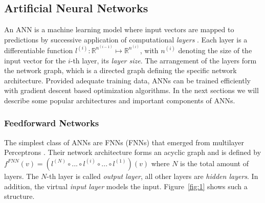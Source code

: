 
\subsection{Artificial Neural Networks}
An \ac{ANN} is a machine learning model where input vectors are mapped to predictions by successive application of computational \textit{layers} \autocite{rumelhart_parallel_1986}. Each layer is a differentiable function $l^{(i)}: \mathbb{R}^{n^{(i-1)}} \mapsto \mathbb{R}^{n^{(i)}}$, with $n^{(i)}$ denoting the size of the input vector for the $i$-th layer, its \textit{layer size}. The arrangement of the layers form the network graph, which is a directed graph defining the specific network architecture. Provided adequate training data, \ac{ANN}s can be trained efficiently with gradient descent based optimization algorithms. In the next sections we will describe some popular architectures and important components of \ac{ANN}s. 

\subsubsection{Feedforward Networks}
The simplest class of \ac{ANN}s are \acl{FNN}s (\acs{FNN}s) that emerged from multilayer Perceptrons \autocite{rosenblatt_perceptron_1958}. Their network architecture forms an acyclic graph and is defined by $f^{FNN}(v) = (l^{(N)} \circ ... \circ l^{(i)} \circ ... \circ l^{(1)})(v)$ where $N$ is the total amount of layers. The $N$-th layer is called \textit{output layer}, all other layers are \textit{hidden layers}. In addition, the virtual \textit{input layer} models the input. Figure~\ref{fig:1} \autocite{epelbaum_deep_2017} shows such a structure. 

